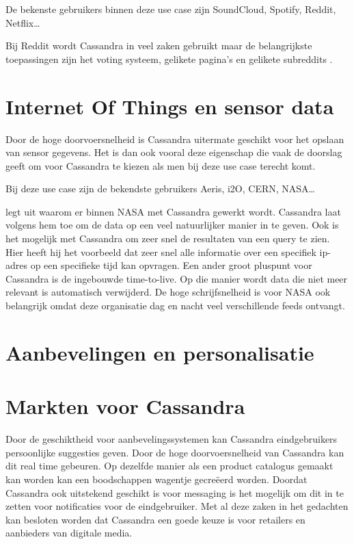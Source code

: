 De bekenste gebruikers binnen deze use case zijn SoundCloud, Spotify, Reddit, Netflix\dots

Bij Reddit wordt Cassandra in veel zaken gebruikt maar de belangrijkste toepassingen zijn  het voting systeem, gelikete pagina's en gelikete subreddits \citep{Harvey2013Reddit}.

\section{Internet Of Things en sensor data}
Door de hoge doorvoersnelheid is Cassandra uitermate geschikt voor het opslaan van sensor gegevens.
Het is dan ook vooral deze eigenschap die vaak de doorslag geeft om voor Cassandra te kiezen als men bij deze use case terecht komt.

Bij deze use case zijn de bekendste gebruikers Aeris, i2O, CERN, NASA\dots

\cite{Keller2013Nasa} legt uit waarom er binnen NASA met Cassandra gewerkt wordt.
Cassandra laat volgens hem toe om de data op een veel natuurlijker manier in te geven.
Ook is het mogelijk met Cassandra om zeer snel de resultaten van een query te zien.
Hier heeft hij het voorbeeld dat zeer snel alle informatie over een specifiek ip-adres op een specifieke tijd kan opvragen.
Een ander groot pluspunt voor Cassandra is de ingebouwde time-to-live.
Op die manier wordt data die niet meer relevant is automatisch verwijderd.
De hoge schrijfsnelheid is voor NASA ook belangrijk omdat deze organisatie dag en nacht veel verschillende feeds ontvangt.

\section{Aanbevelingen en personalisatie}

\section{Markten voor Cassandra}
Door de geschiktheid voor aanbevelingssystemen kan Cassandra eindgebruikers persoonlijke suggesties geven.
Door de hoge doorvoersnelheid van Cassandra kan dit real time gebeuren.
Op dezelfde manier als een product catalogus gemaakt kan worden kan een boodschappen wagentje gecreëerd worden.
Doordat Cassandra ook uitstekend geschikt is voor messaging is het mogelijk om dit in te zetten voor notificaties voor de eindgebruiker.
Met al deze zaken in het gedachten kan besloten worden dat Cassandra een goede keuze is voor retailers en aanbieders van digitale media.

